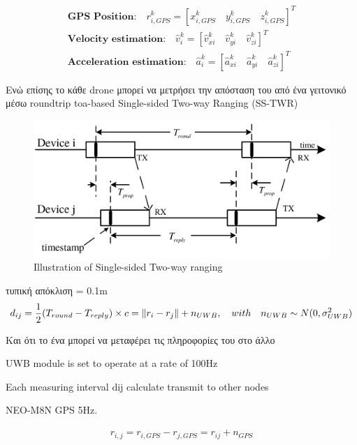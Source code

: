 \begin{gather*}
	\textbf{GPS Position:}\quad r^k_{i, GPS} = \left[x^k_{i, GPS} \quad y^k_{i, GPS} \quad z^k_{i, GPS}\right]^T \\
	\textbf{Velocity estimation:}\quad\hat{v}^k_i = \left[\hat{v}^k_{xi} \quad \hat{v}^k_{yi} \quad \hat{v}^k_{zi}\right]^T \\
	\textbf{Acceleration estimation:}\quad\hat{a}^k_i = \left[\hat{a}^k_{xi} \quad \hat{a}^k_{yi} \quad \hat{a}^k_{zi}\right]^T
\end{gather*}



Ενώ επίσης το κάθε drone μπορεί να μετρήσει την απόσταση του από ένα γειτονικό
μέσω roundtrip toa-based Single-sided Two-way Ranging (SS-TWR)

\begin{figure} [H]
	\centering
	\includegraphics[width=0.7\linewidth]{Images/Related-Work/Single-Sided-Two-Way-Ranging-SS-TWR-5.png}
	\decoRule
	\caption[Illustration of Single-sided Two-way ranging]{Illustration of Single-sided Two-way ranging \cite{uwb-imu-gps1}}
	\label{fig:SS-TWR}
\end{figure}

τυπική απόκλιση = 0.1m
\begin{gather*}
    d_{ij} = \frac{1}{2}(T_{round} - T_{reply}) \times c = \left\lVert r_i - r_j\right\rVert + n_{UWB}, \quad with \quad n_{UWB} \sim N(0, \sigma^2_{UWB}) 
\end{gather*}

Και ότι το ένα μπορεί να μεταφέρει τις πληροφορίες του στο άλλο

UWB module is set to operate at a rate of 100Hz

Each measuring interval
	dij calculate
	transmit to other nodes

NEO-M8N GPS 5Hz.

\begin{gather*}
	r_{i,j} = r_{i, GPS} - r_{j, GPS} = r_{ij} + n_{GPS} \\
\end{gather*}


